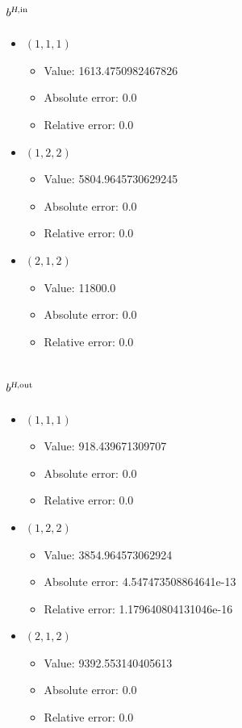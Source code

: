 \documentclass{article}%
\begin{document}
\subsection{$b^{\textsl{H},\text{in}}$}%
\begin{itemize}%
	\item $(1, 1, 1)$%
	\begin{itemize}%
		\item Value: 1613.4750982467826%
		\item Absolute error: 0.0%
		\item Relative error: 0.0%
	\end{itemize}%
	\item $(1, 2, 2)$%
	\begin{itemize}%
		\item Value: 5804.9645730629245%
		\item Absolute error: 0.0%
		\item Relative error: 0.0%
	\end{itemize}%
	\item $(2, 1, 2)$%
	\begin{itemize}%
		\item Value: 11800.0%
		\item Absolute error: 0.0%
		\item Relative error: 0.0%
	\end{itemize}%
\end{itemize}%
\subsection{$b^{\textsl{H},\text{out}}$}%
\begin{itemize}%
	\item $(1, 1, 1)$%
	\begin{itemize}%
		\item Value: 918.439671309707%
		\item Absolute error: 0.0%
		\item Relative error: 0.0%
	\end{itemize}%
	\item $(1, 2, 2)$%
	\begin{itemize}%
		\item Value: 3854.964573062924%
		\item Absolute error: 4.547473508864641e-13%
		\item Relative error: 1.179640804131046e-16%
	\end{itemize}%
	\item $(2, 1, 2)$%
	\begin{itemize}%
		\item Value: 9392.553140405613%
		\item Absolute error: 0.0%
		\item Relative error: 0.0%
	\end{itemize}%
\end{itemize}%
\end{document}
